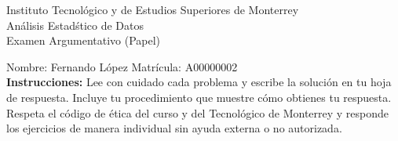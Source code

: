 \documentclass[10pt]{report}
\begin{document}
\newpage



\begin{center}
{\large Instituto Tecnol\'{o}gico y de Estudios Superiores de Monterrey \\
An\'alisis Estad\'stico de Datos } \\
Examen Argumentativo (Papel)
\end{center}

Nombre: \underline{\hspace*{.2in}}
Fernando López
\underline{\hspace*{.2in}} \quad Matr\'icula:\underline{\hspace*{.2in}}
A00000002
\underline{\hspace*{.2in}} \\

{\bf Instrucciones:} Lee con cuidado cada problema y escribe la soluci\'on
en tu hoja de respuesta. Incluye tu procedimiento que muestre c\'omo obtienes tu respuesta.  Respeta el c\'odigo de \'etica del curso y del Tecnol\'ogico de Monterrey y responde los ejercicios de manera individual sin ayuda externa o no autorizada.
\end{document}
